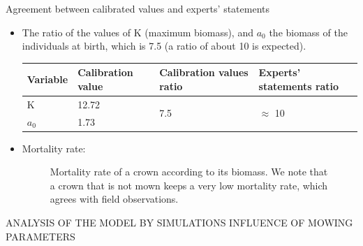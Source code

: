 \documentclass{myBeamer}
\begin{document}
\begin{frame}{\large{Agreement between calibrated values and experts' statements}}
\begin{itemize}

\item  \footnotesize{The ratio of the values of K (maximum biomass), and $a_0$ the biomass of the individuals at birth, which is 7.5 (a ratio of about 10 is expected).}

\bigbreak

\begin{tabular}{llll}
	\hline
     \scriptsize{Variable} &   \scriptsize{Calibration value}  & \scriptsize{Calibration values ratio} & \scriptsize{Experts' statements ratio} \\
   	\hline
		K			&	12.72		& \multirow{2}{*}{7.5} &  \multirow{2}{*}{$\approx$ 10}		\\
		$a_0$			&	1.73		&							&							  \\
     \hline                                   
\end{tabular}

\bigbreak
\item  \footnotesize   Mortality rate:
\begin{figure}[H] 
\caption{ \scriptsize{Mortality rate of a crown according to its biomass. We note that a crown that is not mown keeps a very low mortality rate, which agrees with field observations.}}
\label{MortalityParamMin}
\end{figure}

\end{itemize}
\end{frame}






\begin{frame}{}
\center \huge
ANALYSIS OF THE MODEL BY SIMULATIONS
 \bigbreak \bigbreak
INFLUENCE OF MOWING PARAMETERS
\end{frame}
\end{document}
